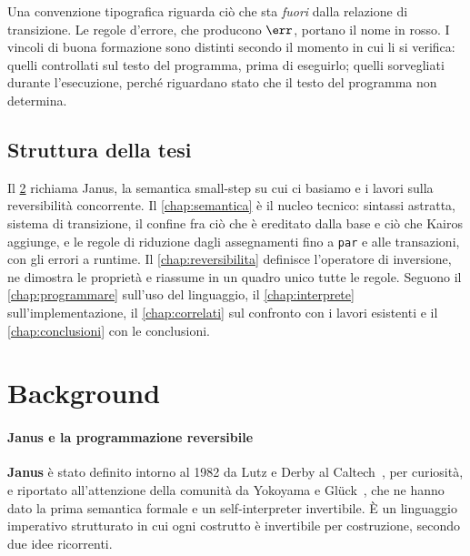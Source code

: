 Una convenzione tipografica riguarda ciò che sta \emph{fuori} dalla relazione di
transizione. Le regole d'errore, che producono $\err$, portano il nome in
\textcolor{red!60!black}{rosso}. I vincoli di buona formazione sono distinti
secondo il momento in cui li si verifica:  quelli controllati
sul testo del programma, prima di eseguirlo;  quelli
sorvegliati durante l'esecuzione, perché riguardano stato che il testo del
programma non determina.

\section{Struttura della tesi}

Il \cref{chap:background} richiama Janus, la semantica small-step su cui ci
basiamo e i lavori sulla reversibilità concorrente. Il \cref{chap:semantica} è
il nucleo tecnico: sintassi astratta, sistema di transizione, il confine fra ciò
che è ereditato dalla base e ciò che Kairos aggiunge, e le regole di riduzione
dagli assegnamenti fino a \texttt{par} e alle transazioni, con gli errori a
runtime. Il \cref{chap:reversibilita} definisce l'operatore di inversione, ne
dimostra le proprietà e riassume in un quadro unico tutte le regole. Seguono il
\cref{chap:programmare} sull'uso del linguaggio, il \cref{chap:interprete}
sull'implementazione, il \cref{chap:correlati} sul confronto con i lavori
esistenti e il \cref{chap:conclusioni} con le conclusioni.

\chapter{Background}
\label{chap:background}
\label{sec:back}

\subsubsection{Janus e la programmazione reversibile}

\textbf{Janus} è stato definito intorno al 1982 da Lutz e Derby al
Caltech~\cite{LutzDerby1982}, per curiosità, e riportato all'attenzione della comunità da Yokoyama e
Glück~\cite{YokoyamaGluck2007}, che ne hanno dato la prima semantica formale e
un self-interpreter invertibile. È un linguaggio imperativo strutturato in cui
ogni costrutto è invertibile per costruzione, secondo due idee ricorrenti.

